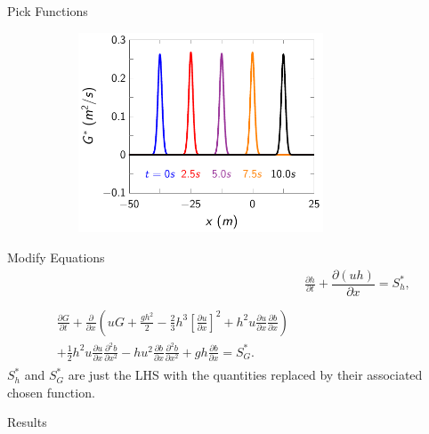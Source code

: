 \documentclass[]{beamer}
\begin{document}
\begin{frame}{Pick Functions}
\begin{figure}
\begin{subfigure}{0.5\textwidth}
	\end{subfigure}%
	\begin{subfigure}{0.5\textwidth}
		\includegraphics[width=0.8\textwidth]{./Pics/DryBed/Forced/G.pdf}
	\end{subfigure}
\end{figure}
	
\end{frame}

\begin{frame}{Modify Equations}
		\begin{align*}
		& \frac{\partial h}{\partial t} + \dfrac{\partial (uh)}{\partial x} = S_h^* ,  \\ \nonumber \\
		\begin{split}
		\frac{\partial G}{\partial t}  + \frac{\partial}{\partial x} \left( {u} G + \frac{gh^2}{2} - \frac{2}{3}h^3 \left[\frac{\partial {u}}{\partial x}\right]^2 + h^2 {u}\frac{\partial {u}}{\partial x}\frac{\partial b}{\partial x} \right) \\ + \frac{1}{2}h^2 {u} \frac{\partial {u}}{\partial x} \frac{\partial^2 b}{\partial x^2}  - h {u}^2\frac{\partial b}{\partial x}\frac{\partial^2 b}{\partial x^2} + gh\frac{\partial b}{\partial x} = S_G^* .
		\end{split}
		\end{align*}
		$S_h^*$ and $S_G^*$ are just the LHS  with the quantities replaced by their associated chosen function.
\end{frame}

\begin{frame}{Results}
\begin{figure}[ht]
\end{figure}
	
\end{frame}
\end{document}
